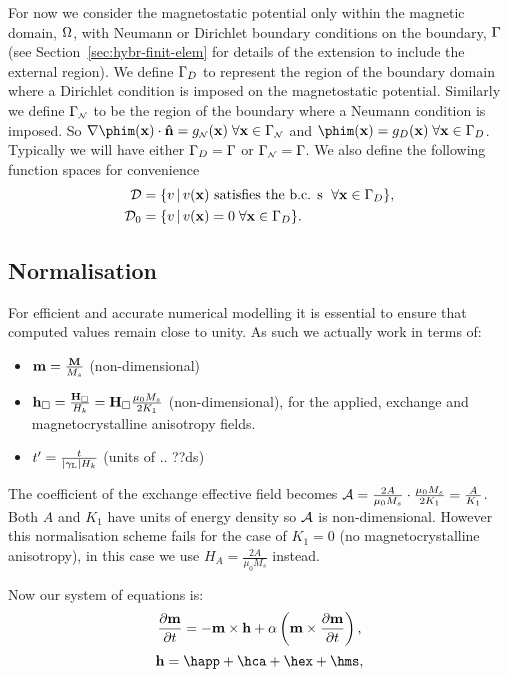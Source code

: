 For now we consider the magnetostatic potential only within the magnetic domain, $\Omega$, with Neumann or Dirichlet boundary conditions on the boundary, ${\Gamma}$ (see Section~\ref{sec:hybr-finit-elem} for details of the extension to include the external region). We define ${\Gamma}_D$ to represent the region of the boundary domain where a Dirichlet condition is imposed on the magnetostatic potential. Similarly we define ${\Gamma}_{\scriptscriptstyle{\mathcal{N}}}$ to be the region of the boundary where a Neumann condition is imposed. So $ \nabla \phim(\xv) \cdot \nv = g_\Neu(\xv) \; \forall \xv \in \boundd_\Neu$ and $\phim(\xv) = g_D(\xv) \; \forall \xv \in \boundd_D$. Typically we will have either ${\Gamma}_D = {\Gamma}$ or ${\Gamma}_{\scriptscriptstyle{\mathcal{N}}} = {\Gamma}$. We also define the following function spaces for convenience
\begin{align}
  \label{eq:037}
  \mathcal{D} & = \{ v \,|\, v(\mathbf{x}) \text{ satisfies the b.c. s } \; \forall \mathbf{x} \in {\Gamma}_D \}, \\
  \mathcal{D}_0 &= \{ v \,|\, v(\mathbf{x}) = 0 \; \forall \mathbf{x} \in {\Gamma}_D \}.
\end{align}

\subsection{Normalisation}
\label{sec:normalisation}

For efficient and accurate numerical modelling it is essential to ensure that computed values remain close to unity. As such we actually work in terms of:
\begin{itemize}
\item $\mathbf{m} = \frac{\mathbf{M}}{M_s}$ (non-dimensional)
\item $\mathbf{h}_{\Box} = \frac{\mathbf{H}_\Box}{H_k} = \mathbf{H}_\Box \frac{\mu_0 M_s}{2 K_1}$ (non-dimensional), for the applied, exchange and magnetocrystalline anisotropy fields.
\item $t' = \frac{t}{{|\gamma_{\text{\tiny{L}}}|} H_k}$ (units of .. ??ds)
\end{itemize}
The coefficient of the exchange effective field becomes $\mathcal{A} = \frac{2A}{\mu_0 M_s} \cdot \frac{\mu_0 M_s}{2 K_1} = \frac{A}{K_1}$. Both $A$ and $K_1$ have units of energy density\cite{Kronmuller2003} so $\mathcal{A}$ is non-dimensional. However this normalisation scheme fails for the case of $K_1 = 0$ (\ie no magnetocrystalline anisotropy), in this case we use $H_A = \frac{2A}{\mu_0 M_s}$ instead.

Now our system of equations is:
\begin{equation}
  \label{eq:llg}
  \frac{\partial \mathbf{m}}{\partial t} = - \mathbf{m} \times \mathbf{h} + \alpha \left( \mathbf{m} \times \frac{\partial \mathbf{m}}{\partial t} \right),
\end{equation}
\begin{equation}
  \label{eq:heff}
  \hv = \happ + \hca + \hex +  \hms,
\end{equation}

